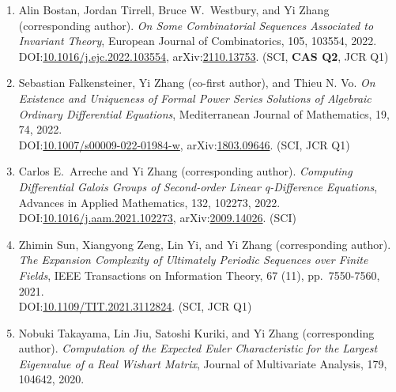 \documentclass[a4paper,12pt]{article}
\begin{document}
\begin{enumerate}
{\em Mahler Discrete Residues and Summability for Rational Functions}. In {\em Proceedings of the 2022 International Symposium on Symbolic and Algebraic Computation (ISSAC)}, 
pp.\ 525–533, ACM Press, 2022. DOI:\href{https://dl.acm.org/doi/10.1145/3476446.3536186}{10.1145/3476446.3536186},
arXiv:\href{https://arxiv.org/abs/2202.09805}{2202.09805}.  (EI, ISSAC is a top international conference in the field ``Algorithms and Theory'', NUS evaluation: Rank 1, AUS evaluation: A+, MSAR field rating: Rank 1, \textbf{conference ranks: A}) 
\item Alin Bostan, Jordan Tirrell, Bruce W.\ Westbury, and Yi Zhang (corresponding author). 
{\em On Some Combinatorial Sequences Associated to Invariant Theory}, European Journal of Combinatorics, 105, 103554, 2022. 
DOI:\href{https://doi.org/10.1016/j.ejc.2022.103554}{10.1016/j.ejc.2022.103554}, 
 arXiv:\href{https://arxiv.org/abs/2110.13753}{2110.13753}.  (SCI, \textbf{CAS Q2}, JCR Q1)
\item Sebastian Falkensteiner, Yi Zhang (co-first author), and Thieu N. Vo. 
{\em On Existence and Uniqueness of Formal Power Series Solutions of Algebraic Ordinary
     Differential Equations},  Mediterranean Journal of Mathematics, 19, 74, 2022. 
\\ DOI:\href{https://doi.org/10.1007/s00009-022-01984-w}{10.1007/s00009-022-01984-w}, 
arXiv:\href{https://arxiv.org/abs/1803.09646}{1803.09646}. (SCI, JCR Q1) 
\item Carlos E.\ Arreche and Yi Zhang (corresponding author). 
{\em Computing Differential Galois Groups of Second-order Linear q-Difference Equations}, Advances in Applied Mathematics, 132, 102273, 2022. 
DOI:\href{https://doi.org/10.1016/j.aam.2021.102273}{10.1016/j.aam.2021.102273}, 
arXiv:\href{https://arxiv.org/abs/2009.14026}{2009.14026}. (SCI)
\item Zhimin Sun,  Xiangyong Zeng, Lin Yi, and Yi Zhang (corresponding author). 
{\em The Expansion Complexity of Ultimately Periodic Sequences over Finite Fields},  IEEE Transactions on Information Theory, 67 (11), pp.\ 7550-7560, 2021. \\ 
DOI:\href{https://doi.org/10.1109/TIT.2021.3112824}{10.1109/TIT.2021.3112824}. (SCI, JCR Q1)
 \item Nobuki Takayama, Lin Jiu, Satoshi Kuriki, and Yi Zhang (corresponding author). 
 {\em Computation of the Expected Euler Characteristic for the Largest Eigenvalue of a Real Wishart Matrix}, Journal of Multivariate Analysis, 179, 104642, 2020. \\

\end{enumerate}
\end{document}
